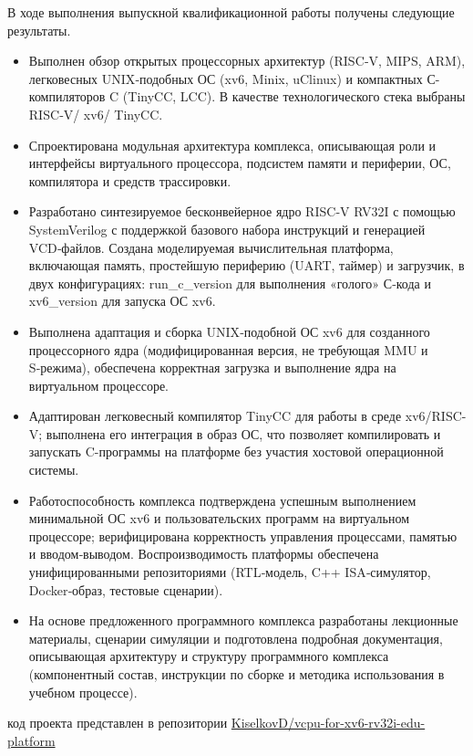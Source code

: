   В ходе выполнения выпускной квалификационной работы получены следующие результаты.
  \begin{itemize}
    \item Выполнен обзор открытых процессорных архитектур (RISC‑V, MIPS, ARM), легковесных UNIX‑подобных ОС (xv6, Minix, uClinux) и компактных С-компиляторов C (TinyCC, LCC). В качестве технологического стека выбраны RISC‑V/ xv6/ TinyCC.
    \item Спроектирована модульная архитектура комплекса, описывающая роли и интерфейсы виртуального процессора, подсистем памяти и периферии, ОС, компилятора и средств трассировки.
    \item Разработано синтезируемое бесконвейерное ядро RISC‑V RV32I с помощью SystemVerilog с поддержкой базового набора инструкций и генерацией VCD‑файлов. Создана моделируемая вычислительная платформа, включающая память, простейшую периферию (UART, таймер) и загрузчик, в двух конфигурациях: run\_c\_version для выполнения «голого» С‑кода и xv6\_version для запуска ОС xv6.
    \item Выполнена адаптация и сборка UNIX‑подобной ОС xv6 для созданного процессорного ядра (модифицированная версия, не требующая MMU и S‑режима), обеспечена корректная загрузка и выполнение ядра на виртуальном процессоре.
    \item Адаптирован легковесный компилятор TinyCC для работы в среде xv6/RISC-V; выполнена его интеграция в образ ОС, что позволяет компилировать и запускать C-программы на платформе без участия хостовой операционной системы.
    \item Работоспособность комплекса подтверждена успешным выполнением минимальной ОС xv6 и пользовательских программ на виртуальном процессоре; верифицирована корректность управления процессами, памятью и вводом‑выводом. Воспроизводимость платформы обеспечена унифицированными репозиториями (RTL‑модель, C++ ISA‑симулятор, Docker‑образ, тестовые сценарии).
    \item На основе предложенного программного комплекса разработаны лекционные материалы, сценарии симуляции и подготовлена подробная документация, описывающая архитектуру и структуру программного комплекса (компонентный состав, инструкции по сборке и методика использования в учебном процессе).
  \end{itemize}
	код проекта представлен в репозитории \href{https://github.com/KiselkovD/vcpu-for-xv6-rv32i-edu-platform}{KiselkovD/vcpu-for-xv6-rv32i-edu-platform}
